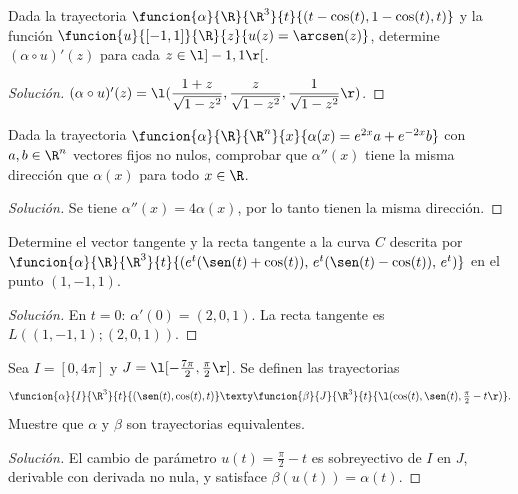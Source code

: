 \documentclass[a4,11pt]{aleph-notas}
\begin{document}
\begin{ejer}
    Dada la trayectoria $\funcion{\alpha}{\R}{\R^3}{t}{(t-\cos(t),1-\cos(t),t)}$ y la función $\funcion{u}{[-1,1]}{\R}{z}{u(z)=\arcsen(z)}$, determine $(\alpha \circ u)'(z)$ para cada $z\in \l] -1,1 \r[$.
\end{ejer}

\begin{proof}[Solución]
    $(\alpha \circ u)'(z)=\l(\dfrac{1+z}{\sqrt{1-z^2}},\dfrac{z}{\sqrt{1-z^2}},\dfrac{1}{\sqrt{1-z^2}}\r)$.
\end{proof}

\begin{ejer}
    Dada la trayectoria $\funcion{\alpha}{\R}{\R^n}{x}{\alpha(x)=e^{2x}a+e^{-2x}b}$ con $a,b \in \R^n$ vectores fijos no nulos, comprobar que $\alpha''(x)$ tiene la misma dirección que $\alpha(x)$ para todo $x\in\R$.
\end{ejer}

\begin{proof}[Solución]
    Se tiene $\alpha''(x)=4\alpha(x)$, por lo tanto tienen la misma dirección.
\end{proof}

\begin{ejer}
    Determine el vector tangente y la recta tangente a la curva $C$ descrita por
    $\funcion{\alpha}{\R}{\R^3}{t}{(e^t(\sen(t)+\cos(t)),\,e^t(\sen(t)-\cos(t)),\,e^t)}$
    en el punto $(1,-1,1)$.
\end{ejer}

\begin{proof}[Solución]
    En $t=0$: $\alpha'(0)=(2,0,1)$. La recta tangente es $L((1,-1,1);(2,0,1))$.
\end{proof}

\begin{ejer}
    Sea $I = [0, 4\pi]$ y $J = \l[-\frac{7\pi}{2}, \frac{\pi}{2}\r]$. Se definen las trayectorias
    \[
        \funcion{\alpha}{I}{\R^3}{t}{(\sen(t), \cos(t), t)}
        \texty
        \funcion{\beta}{J}{\R^3}{t}{\l(\cos(t), \sen(t), \tfrac{\pi}{2} - t\r)}.
    \]
    Muestre que $\alpha$ y $\beta$ son trayectorias equivalentes.
\end{ejer}

\begin{proof}[Solución]
    El cambio de parámetro $u(t)=\frac{\pi}{2}-t$ es sobreyectivo de $I$ en $J$, derivable con derivada no nula, y satisface $\beta(u(t))=\alpha(t)$.
\end{proof}
\end{document}
